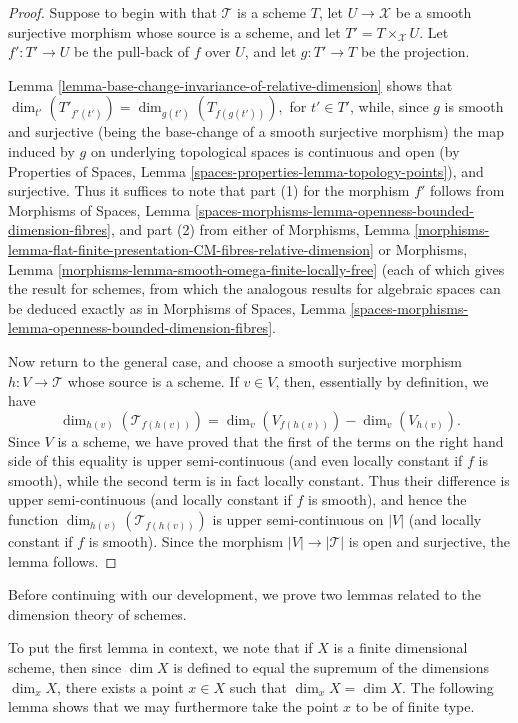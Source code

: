 \documentclass{stacks-project}
\theoremstyle{plain}
\theoremstyle{definition}
\theoremstyle{remark}
\numberwithin{equation}{subsection}
\begin{document}
\begin{proof}
Suppose to begin with that $\mathcal{T}$ is a scheme $T$,
let $U \to \mathcal{X}$ be a smooth surjective morphism whose source
is a scheme, and let $T' = T \times_{\mathcal{X}} U$.
Let $f': T' \to U$ be the pull-back of $f$ over $U$,
and let $g: T' \to T$ be the projection.

\medskip\noindent
Lemma \ref{lemma-base-change-invariance-of-relative-dimension}
shows that $\dim_{t'}(T'_{f'(t')}) = \dim_{g(t')}(T_{f(g(t'))}),$
for $t' \in T'$, while,
since $g$ is smooth and surjective (being the base-change
of a smooth surjective morphism) the map induced by $g$ on underlying
topological spaces is continuous and open
(by
Properties of Spaces, Lemma \ref{spaces-properties-lemma-topology-points}), and
surjective. Thus it suffices to note that part (1) for the morphism $f'$
follows from
Morphisms of Spaces, Lemma
\ref{spaces-morphisms-lemma-openness-bounded-dimension-fibres}, and part (2)
from either of Morphisms, Lemma
\ref{morphisms-lemma-flat-finite-presentation-CM-fibres-relative-dimension}
or
Morphisms, Lemma \ref{morphisms-lemma-smooth-omega-finite-locally-free}
(each of which gives the result for schemes, from which
the analogous results for algebraic spaces can
be deduced exactly as in
Morphisms of Spaces, Lemma
\ref{spaces-morphisms-lemma-openness-bounded-dimension-fibres}.

\medskip\noindent
Now return to the general case,
and choose a smooth surjective morphism
$h:V \to \mathcal{T}$ whose source is a scheme.
If $v \in V$, then, essentially by definition,
we have
$$
\dim_{h(v)}(\mathcal{T}_{f(h(v))}) =
\dim_{v}(V_{f(h(v))}) - \dim_{v}(V_{h(v)}).
$$
Since $V$ is a scheme, we have proved that the first
of the terms on the right hand side of this equality
is upper semi-continuous (and even locally
constant if $f$ is smooth), while the second term is
in fact locally constant.
Thus their difference is upper semi-continuous
(and locally constant if $f$ is smooth),
and hence the function
$\dim_{h(v)}(\mathcal{T}_{f(h(v))})$
is upper semi-continuous on $|V|$ (and locally
constant if $f$ is smooth).
Since the morphism $|V| \to |\mathcal{T}|$ is open and surjective,
the lemma follows.
\end{proof}

\noindent
Before continuing with our development,
we prove two lemmas related to the dimension theory of schemes.

\medskip\noindent
To put the first lemma in context,
we note that if $X$ is a finite dimensional scheme, then since $\dim X$
is defined to equal the supremum of the dimensions $\dim_x X$,
there exists a point $x \in X$ such that $\dim_x X = \dim X$.
The following lemma shows that we may furthermore take the point
$x$ to be of finite type.
\end{document}
